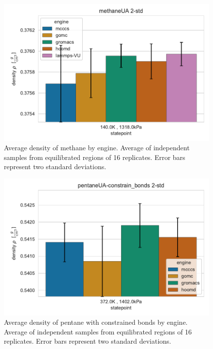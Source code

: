 \begin{figure}[h!]
    \centering
    \includegraphics[width=0.8\linewidth,keepaspectratio]{figures/rep_study/methaneUA_summary_bar_2std.pdf}
    \caption{Average density of methane by engine. Average of independent samples from equilibrated regions of 16 replicates. Error bars represent two standard deviations.}\label{fig:methane_density}
\end{figure}

\begin{figure}[h!]
    \centering
    \includegraphics[width=0.8\linewidth,keepaspectratio]{figures/rep_study/pentaneUA-constrain_bonds_summary_bar_2std.pdf}
    \caption{Average density of pentane with constrained bonds by engine. Average of independent samples from equilibrated regions of 16 replicates. Error bars represent two standard deviations.}\label{fig:pentane_constrain_density}
\end{figure}

